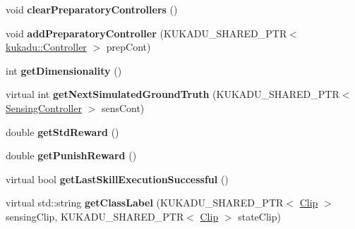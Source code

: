 \begin{DoxyCompactItemize}
\item 
void {\bfseries clear\+Preparatory\+Controllers} ()\hypertarget{classkukadu_1_1ComplexController_a5c9e2b9e0e9eb58eef8a8b9eceebcb7f}{}\label{classkukadu_1_1ComplexController_a5c9e2b9e0e9eb58eef8a8b9eceebcb7f}

\item 
void {\bfseries add\+Preparatory\+Controller} (K\+U\+K\+A\+D\+U\+\_\+\+S\+H\+A\+R\+E\+D\+\_\+\+P\+TR$<$ \hyperlink{classkukadu_1_1Controller}{kukadu\+::\+Controller} $>$ prep\+Cont)\hypertarget{classkukadu_1_1ComplexController_ad432f3b834ecbaba5b47604a695705a6}{}\label{classkukadu_1_1ComplexController_ad432f3b834ecbaba5b47604a695705a6}

\item 
int {\bfseries get\+Dimensionality} ()\hypertarget{classkukadu_1_1ComplexController_abc9b91acb5e94cbc6a4edd1ba3a38583}{}\label{classkukadu_1_1ComplexController_abc9b91acb5e94cbc6a4edd1ba3a38583}

\item 
virtual int {\bfseries get\+Next\+Simulated\+Ground\+Truth} (K\+U\+K\+A\+D\+U\+\_\+\+S\+H\+A\+R\+E\+D\+\_\+\+P\+TR$<$ \hyperlink{classkukadu_1_1SensingController}{Sensing\+Controller} $>$ sens\+Cont)\hypertarget{classkukadu_1_1ComplexController_a1b272529d7f87ba1bfe9fde5e99f98de}{}\label{classkukadu_1_1ComplexController_a1b272529d7f87ba1bfe9fde5e99f98de}

\item 
double {\bfseries get\+Std\+Reward} ()\hypertarget{classkukadu_1_1ComplexController_af16017799bf3b952bcc97a5ea903b95d}{}\label{classkukadu_1_1ComplexController_af16017799bf3b952bcc97a5ea903b95d}

\item 
double {\bfseries get\+Punish\+Reward} ()\hypertarget{classkukadu_1_1ComplexController_ae419d2cd6751f25c03b7b4bf44246bc7}{}\label{classkukadu_1_1ComplexController_ae419d2cd6751f25c03b7b4bf44246bc7}

\item 
virtual bool {\bfseries get\+Last\+Skill\+Execution\+Successful} ()\hypertarget{classkukadu_1_1ComplexController_a43b2bfa0e5c3a4eb2492d41116ee3ef8}{}\label{classkukadu_1_1ComplexController_a43b2bfa0e5c3a4eb2492d41116ee3ef8}

\item 
virtual std\+::string {\bfseries get\+Class\+Label} (K\+U\+K\+A\+D\+U\+\_\+\+S\+H\+A\+R\+E\+D\+\_\+\+P\+TR$<$ \hyperlink{classkukadu_1_1Clip}{Clip} $>$ sensing\+Clip, K\+U\+K\+A\+D\+U\+\_\+\+S\+H\+A\+R\+E\+D\+\_\+\+P\+TR$<$ \hyperlink{classkukadu_1_1Clip}{Clip} $>$ state\+Clip)\hypertarget{classkukadu_1_1ComplexController_a9a581a10af011e183d4ae862a67951cf}{}\label{classkukadu_1_1ComplexController_a9a581a10af011e183d4ae862a67951cf}


\end{DoxyCompactItemize}
